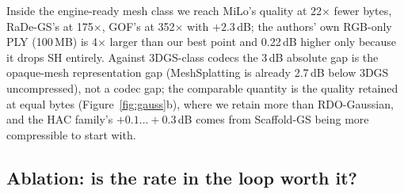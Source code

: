 \documentclass[11pt,a4paper]{article}
\begin{document}
\begin{table}[t]
\centering\scriptsize
\caption{Cross-method comparison, dataset means, 3DGS-class methods (not engine-ready meshes). Published numbers verbatim; FPS as reported, hardware differs by row; ``--'' = not reported. Ours (Table~\ref{tab:cross-mesh}) is $\approx 3$\,dB below this class in absolute PSNR; this is the opaque-mesh representation gap, present already in uncompressed MeshSplatting.}
\label{tab:cross-3dgs}
\setlength{\tabcolsep}{4pt}
\end{table}

Inside the engine-ready mesh class we reach MiLo's quality at 22$\times$ fewer bytes, RaDe-GS's at 175$\times$, GOF's at 352$\times$ with $+2.3$\,dB; the authors' own RGB-only PLY (100\,MB) is 4$\times$ larger than our best point and 0.22\,dB higher only because it drops SH entirely. Against 3DGS-class codecs the 3\,dB absolute gap is the opaque-mesh representation gap (MeshSplatting is already 2.7\,dB below 3DGS uncompressed), not a codec gap; the comparable quantity is the quality retained at equal bytes (Figure~\ref{fig:gauss}b), where we retain more than RDO-Gaussian, and the HAC family's $+0.1\ldots+0.3$\,dB comes from Scaffold-GS being more compressible to start with.

\subsection{Ablation: is the rate in the loop worth it?}
\label{sec:ablation}
\end{document}
